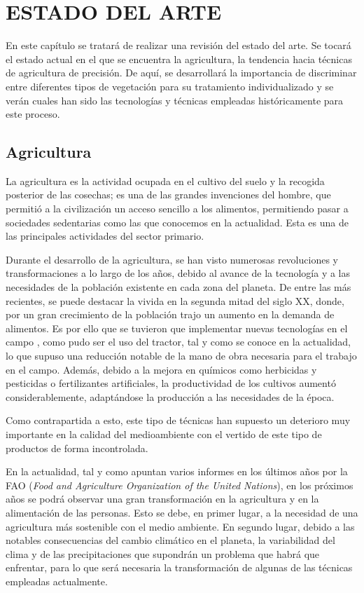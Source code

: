 %
\chapter{ESTADO DEL ARTE}
\label{sec:estado del arte}

En este capítulo se tratará de realizar una revisión del estado del arte. Se tocará el estado actual en el que se encuentra la agricultura, la tendencia hacia técnicas de agricultura de precisión. De aquí, se desarrollará la importancia de discriminar entre diferentes tipos de vegetación para su tratamiento individualizado y se verán cuales han sido las tecnologías y técnicas empleadas históricamente para este proceso.

\section{Agricultura}

La agricultura es la actividad ocupada en el cultivo del suelo y la recogida posterior de las cosechas; es una de las grandes invenciones del hombre, que permitió a la civilización un acceso sencillo a los alimentos, permitiendo pasar a sociedades sedentarias como las que conocemos en la actualidad. Esta es una de las principales actividades del sector primario.

Durante el desarrollo de la agricultura, se han visto numerosas revoluciones y transformaciones a lo largo de los años, debido al avance de la tecnología y a las necesidades de la población existente en cada zona del planeta. De entre las más recientes, se puede destacar la vivida en la segunda mitad del siglo XX, donde, por un gran crecimiento de la población trajo un aumento en la demanda de alimentos. Es por ello que se tuvieron que implementar nuevas tecnologías en el campo \cite{Shuler2003}, como pudo ser el uso del tractor, tal y como se conoce en la actualidad, lo que supuso una reducción notable de la mano de obra necesaria para el trabajo en el campo. Además, debido a la mejora en químicos como herbicidas y pesticidas o fertilizantes artificiales, la productividad de los cultivos aumentó considerablemente, adaptándose la producción a las necesidades de la época.

Como contrapartida a esto, este tipo de técnicas han supuesto un deterioro muy importante en la calidad del medioambiente con el vertido de este tipo de productos de forma incontrolada.

En la actualidad, tal y como apuntan varios informes \cite{fao_agricultura_2020} \cite{food2004agricultura} en los últimos años por la FAO (\textit{Food and Agriculture Organization of the United Nations}), en los próximos años se podrá observar una gran transformación en la agricultura y en la alimentación de las personas. Esto se debe, en primer lugar, a la necesidad de una agricultura más sostenible con el medio ambiente. En segundo lugar, debido a las notables consecuencias del cambio climático en el planeta, la variabilidad del clima y de las precipitaciones que supondrán un problema que habrá que enfrentar, para lo que será necesaria la transformación de algunas de las técnicas empleadas actualmente. 

